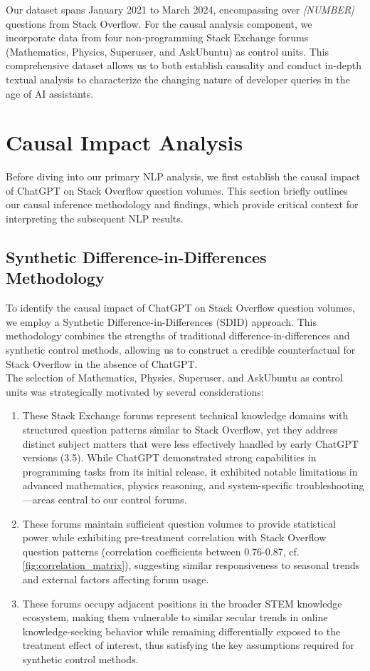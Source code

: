 Our dataset spans January 2021 to March 2024, encompassing over \textit{[NUMBER]} questions from Stack Overflow. For the causal analysis component, we incorporate data from four non-programming Stack Exchange forums (Mathematics, Physics, Superuser, and AskUbuntu) as control units. This comprehensive dataset allows us to both establish causality and conduct in-depth textual analysis to characterize the changing nature of developer queries in the age of AI assistants.

\section{Causal Impact Analysis}
Before diving into our primary NLP analysis, we first establish the causal impact of ChatGPT on Stack Overflow question volumes. This section briefly outlines our causal inference methodology and findings, which provide critical context for interpreting the subsequent NLP results.

\subsection{Synthetic Difference-in-Differences Methodology}
To identify the causal impact of ChatGPT on Stack Overflow question volumes, we employ a Synthetic Difference-in-Differences (SDID) approach. This methodology combines the strengths of traditional difference-in-differences and synthetic control methods, allowing us to construct a credible counterfactual for Stack Overflow in the absence of ChatGPT.\\

The selection of Mathematics, Physics, Superuser, and AskUbuntu as control units was strategically motivated by several considerations:
\begin{enumerate}
    \item These Stack Exchange forums represent technical knowledge domains with structured question patterns similar to Stack Overflow, yet they address distinct subject matters that were less effectively handled by early ChatGPT versions (3.5). While ChatGPT demonstrated strong capabilities in programming tasks from its initial release, it exhibited notable limitations in advanced mathematics, physics reasoning, and system-specific troubleshooting—areas central to our control forums. 
    \item These forums maintain sufficient question volumes to provide statistical power while exhibiting pre-treatment correlation with Stack Overflow question patterns (correlation coefficients between 0.76-0.87, cf. \ref{fig:correlation_matrix}), suggesting similar responsiveness to seasonal trends and external factors affecting forum usage. 
    \item These forums occupy adjacent positions in the broader STEM knowledge ecosystem, making them vulnerable to similar secular trends in online knowledge-seeking behavior while remaining differentially exposed to the treatment effect of interest, thus satisfying the key assumptions required for synthetic control methods.
\end{enumerate}

